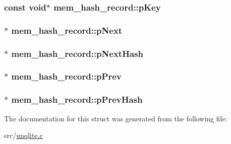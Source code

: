 \hypertarget{structmem__hash__record_ae33b1c9e1f10f320881465387b194660}{
\subsubsection[{p\-Key}]{\setlength{\rightskip}{0pt plus 5cm}const void$\ast$ mem\-\_\-hash\-\_\-record\-::p\-Key}}\label{d3/d0c/structmem__hash__record_ae33b1c9e1f10f320881465387b194660}
\hypertarget{structmem__hash__record_a58735495fc38b3b07358e96c7f2ade6b}{
\subsubsection[{p\-Next}]{$\ast$ mem\-\_\-hash\-\_\-record\-::p\-Next}}\label{d3/d0c/structmem__hash__record_a58735495fc38b3b07358e96c7f2ade6b}
\hypertarget{structmem__hash__record_abe7d59dec4d896ff89d7b022d17ca687}{
\subsubsection[{p\-Next\-Hash}]{$\ast$ mem\-\_\-hash\-\_\-record\-::p\-Next\-Hash}}\label{d3/d0c/structmem__hash__record_abe7d59dec4d896ff89d7b022d17ca687}
\hypertarget{structmem__hash__record_a62e5da2b57ba4417b26cf175970e5055}{
\subsubsection[{p\-Prev}]{ $\ast$ mem\-\_\-hash\-\_\-record\-::p\-Prev}}\label{d3/d0c/structmem__hash__record_a62e5da2b57ba4417b26cf175970e5055}
\hypertarget{structmem__hash__record_a3683cef4dcce93469fb65f48a06ba867}{
\subsubsection[{p\-Prev\-Hash}]{ $\ast$ mem\-\_\-hash\-\_\-record\-::p\-Prev\-Hash}}\label{d3/d0c/structmem__hash__record_a3683cef4dcce93469fb65f48a06ba867}


The documentation for this struct was generated from the following file\-:\begin{DoxyCompactItemize}
\item 
src/\hyperlink{unqlite_8c}{unqlite.\-c}\end{DoxyCompactItemize}
